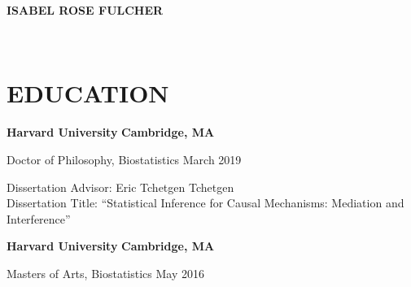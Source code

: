 \documentclass[12pt]{article}
\begin{document}
\newcommand{\MYhref}[3][blue]{\href{#2}{\color{#1}{#3}}}%
\begin{center}
	\textbf{
			{\huge I}{\Large SABEL} \hspace{-0.1em} 
			{\huge R}{\Large OSE} \hspace{-0.1em} 
			{\huge F}{\Large ULCHER}}\\
\end{center}
\begin{minipage}[t]{0.5\linewidth}
\begin{flushleft}
	\MYhref[black]{mailto:isabel_fulcher@hms.harvard.edu}{isabel\_fulcher@hms.harvard.edu} \\
	\MYhref[black]{http://orcid.org/0000-0002-1209-824X}{ORCID: 0000-0002-1209-824X} 
\end{flushleft}
\end{minipage}
\begin{minipage}[t]{0.5\linewidth} 
\end{minipage}

\section*{\textbf{{\large E}DUCATION}}

\textbf{Harvard University} \hfill \hfill \textbf{Cambridge, MA}

Doctor of Philosophy, Biostatistics \hfill \hfill March 2019 
\begin{addmargin}[1em]{2em} \small{Dissertation Advisor: Eric Tchetgen Tchetgen} \\
\small{Dissertation Title: ``Statistical Inference for Causal Mechanisms: Mediation and Interference'' \\} \end{addmargin} 

\textbf{Harvard University} \hfill \hfill \textbf{Cambridge, MA}

Masters of Arts, Biostatistics \hfill \hfill May 2016

\vspace{.5cm}
\end{document}
